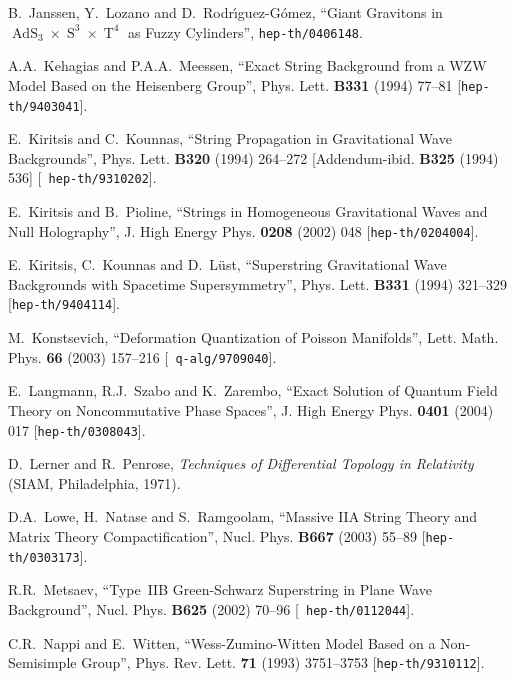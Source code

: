 \documentclass[11pt,a4paper]{article}
\DeclareMathOperator{\AdS}{AdS}
\DeclareMathOperator{\Sphere}{S}
\DeclareMathOperator{\Torus}{T}
\let\S\Sphere
\begin{document}
\begin{thebibliography}{99}
 B.~Janssen, Y.~Lozano and D.~Rodr\'{\i}guez-G\'omez,
  ``Giant Gravitons in $\AdS_3\times\S^3\times\Torus^4$ as Fuzzy
  Cylinders'', {\tt hep-th/0406148}.

 A.A.~Kehagias and P.A.A.~Meessen, ``Exact String
  Background from a WZW Model Based on the Heisenberg Group'',
  Phys. Lett. {\bf B331} (1994) 77--81 [{\tt hep-th/9403041}].

 E.~Kiritsis and C.~Kounnas, ``String Propagation in
  Gravitational Wave Backgrounds'', Phys. Lett. {\bf B320} (1994)
  264--272 [Addendum-ibid. {\bf B325} (1994) 536] [{\tt
    hep-th/9310202}].

 E.~Kiritsis and B.~Pioline, ``Strings in Homogeneous
  Gravitational Waves and Null Holography'', J. High Energy Phys. {\bf
    0208} (2002) 048 [{\tt hep-th/0204004}].

 E.~Kiritsis, C.~Kounnas and D.~L\"ust, ``Superstring
  Gravitational Wave Backgrounds with Spacetime Supersymmetry'',
  Phys. Lett. {\bf B331} (1994) 321--329 [{\tt hep-th/9404114}].

 M.~Konstsevich, ``Deformation Quantization of Poisson
  Manifolds'', Lett. Math. Phys. {\bf 66} (2003) 157--216 [{\tt
    q-alg/9709040}].

 E.~Langmann, R.J.~Szabo and K.~Zarembo, ``Exact
  Solution of Quantum Field Theory on Noncommutative Phase Spaces'',
  J. High Energy Phys. {\bf 0401} (2004) 017 [{\tt hep-th/0308043}].

 D.~Lerner and R.~Penrose, {\it Techniques of
    Differential Topology in Relativity} (SIAM, Philadelphia, 1971).

 D.A.~Lowe, H.~Natase and S.~Ramgoolam, ``Massive IIA
  String Theory and Matrix Theory Compactification'', Nucl. Phys. {\bf
    B667} (2003) 55--89 [{\tt hep-th/0303173}].

 R.R.~Metsaev, ``Type~IIB Green-Schwarz Superstring in
  Plane Wave Background'', Nucl. Phys. {\bf B625} (2002) 70--96 [{\tt
    hep-th/0112044}].

 C.R.~Nappi and E.~Witten, ``Wess-Zumino-Witten Model Based on a
  Non-Semisimple Group'', Phys. Rev. Lett. {\bf 71} (1993) 3751--3753
  [{\tt hep-th/9310112}].


\end{thebibliography}
\end{document}
